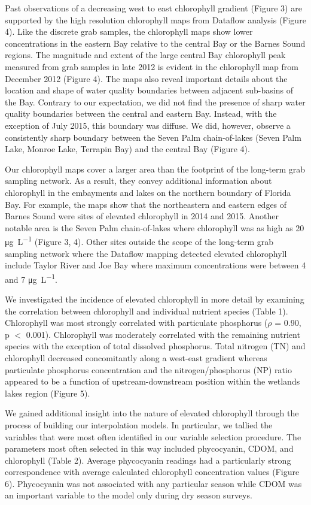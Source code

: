 Past observations of a decreasing west to east chlorophyll gradient (Figure 3) are supported by the high resolution chlorophyll maps from Dataflow analysis (Figure 4). Like the discrete grab samples, the chlorophyll maps show lower concentrations in the eastern Bay relative to the central Bay or the Barnes Sound regions. The magnitude and extent of the large central Bay chlorophyll peak measured from grab samples in late 2012 is evident in the chlorophyll map from December 2012 (Figure 4). The maps also reveal important details about the location and shape of water quality boundaries between adjacent sub-basins of the Bay. Contrary to our expectation, we did not find the presence of sharp water quality boundaries between the central and eastern Bay. Instead, with the exception of July 2015, this boundary was diffuse. We did, however, observe a consistently sharp boundary between the Seven Palm chain-of-lakes (Seven Palm Lake, Monroe Lake, Terrapin Bay) and the central Bay (Figure 4). 

Our chlorophyll maps cover a larger area than the footprint of the long-term grab sampling network. As a result, they convey additional information about chlorophyll in the embayments and lakes on the northern boundary of Florida Bay. For example, the maps show that the northeastern and eastern edges of Barnes Sound were sites of elevated chlorophyll in 2014 and 2015. Another notable area is the Seven Palm chain-of-lakes where chlorophyll was as high as 20 \si{\micro\gram\per\liter} (Figure 3, 4). Other sites outside the scope of the long-term grab sampling network where the Dataflow mapping detected elevated chlorophyll include Taylor River and Joe Bay where maximum concentrations were between 4 and 7 \si{\micro\gram\per\liter}. 

We investigated the incidence of elevated chlorophyll in more detail by examining the correlation between chlorophyll and individual nutrient species (Table 1). Chlorophyll was most strongly correlated with particulate phosphorus ($\rho$ = 0.90, p $<$ 0.001). Chlorophyll was moderately correlated with the remaining nutrient species with the exception of total dissolved phosphorus. Total nitrogen (TN) and chlorophyll decreased concomitantly along a west-east gradient whereas particulate phosphorus concentration and the nitrogen/phosphorus (NP) ratio appeared to be a function of upstream-downstream position within the wetlands lakes region (Figure 5).  

We gained additional insight into the nature of elevated chlorophyll through the process of building our interpolation models. In particular, we tallied the variables that were most often identified in our variable selection procedure. The parameters most often selected in this way included phycocyanin, CDOM, and chlorophyll (Table 2). Average phycocyanin readings had a particularly strong correspondence with average calculated chlorophyll concentration values (Figure 6). Phycocyanin was not associated with any particular season while CDOM was an important variable to the model only during dry season surveys.

